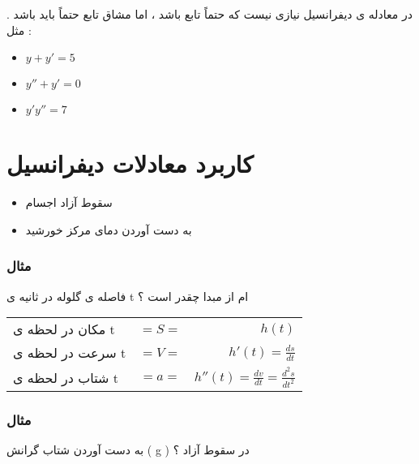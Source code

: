 \documentclass[12pt]{book}
\begin{document}
\begin{tcolorbox}
در معادله ی دیفرانسیل نیازی نیست که حتماً تابع باشد ، اما مشاق تابع حتماً باید باشد . مثل :
\begin{itemize}
	\item $y + y' = 5$
	\item $y'' + y' = 0$
	\item $y'y'' = 7$
\end{itemize}
\end{tcolorbox}

\section{کاربرد معادلات دیفرانسیل}

\begin{tcolorbox}
\begin{itemize}
	\item سقوط آزاد اجسام
	\item به دست آوردن دمای مرکز خورشید
\end{itemize}
\end{tcolorbox}


\subsubsection{مثال}
فاصله ی گلوله در ثانیه ی t ام از مبدا چقدر است ؟


\begin{center}
  \bgroup
  \def\arraystretch{1.5}%
  \begin{tabular}{  l  c  r }
    مکان در لحظه ی t
     & $= S =$  & $h(t)$ \\ 
    سرعت در لحظه ی t
     & $= V =$  & $h'(t) = \frac{ds}{dt}$ \\ 
    شتاب در لحظه ی t
     & $= a =$  & $h''(t) = \frac{dv}{dt} =  \frac{d^{2}s}{dt^{2}}$ \\
  \end{tabular}
  \egroup
\end{center}

\newpage

\subsubsection{مثال}
به دست آوردن شتاب گرانش ( g ) در سقوط آزاد ؟
\end{document}
